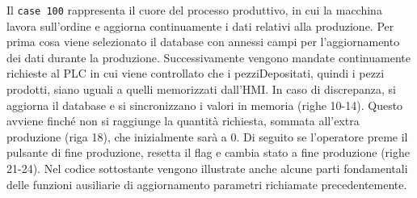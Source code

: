 Il \verb|case 100| rappresenta il cuore del processo produttivo, in cui la macchina lavora sull'ordine e aggiorna continuamente i dati relativi alla produzione. Per prima cosa viene selezionato il database con annessi campi per l'aggiornamento dei dati durante la produzione. Successivamente vengono mandate continuamente richieste al PLC in cui viene controllato che i pezziDepositati, quindi i pezzi prodotti, siano uguali a quelli memorizzati dall'HMI. In caso di discrepanza, si aggiorna il database e si sincronizzano i valori in memoria (righe 10-14). Questo avviene finché non si raggiunge la quantità richiesta, sommata all'extra produzione (riga 18), che inizialmente sarà a 0. Di seguito se l'operatore preme il pulsante di fine produzione, resetta il flag e cambia stato a fine produzione (righe 21-24). Nel codice sottostante vengono illustrate anche alcune parti fondamentali delle funzioni ausiliarie di aggiornamento parametri richiamate precedentemente.
